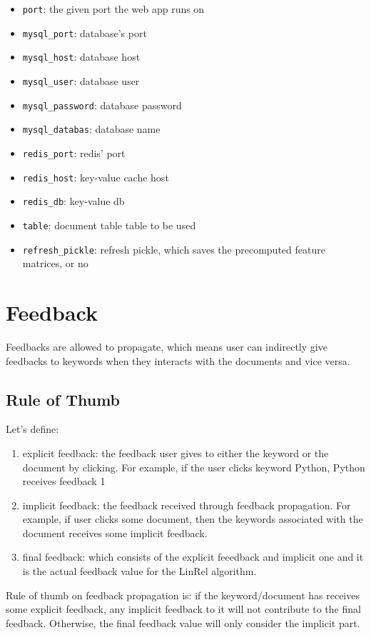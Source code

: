 \documentclass[10pt,a4paper]{article}
\begin{document}
\begin{itemize}
\item \verb+port+:  the given port  the web app runs on
\item \verb+mysql_port+:  database's port 
\item \verb+mysql_host+: database host
\item \verb+mysql_user+:  database user
\item \verb+mysql_password+:   database password
\item \verb+mysql_databas+:  database name
\item \verb+redis_port+:  redis' port 
\item \verb+redis_host+: key-value cache host
\item \verb+redis_db+: key-value db
\item \verb+table+:  document table table to be used 
\item \verb+refresh_pickle+: refresh pickle, which saves the precomputed feature matrices, or no
\end{itemize}

\section{Feedback}

Feedbacks are allowed to propagate, which means user can indirectly give feedbacks to keywords when they interacts with the documents and vice versa.

\subsection{Rule of Thumb}

Let's define:
\begin{enumerate}
  \item explicit feedback: the feedback user gives to either the keyword or the document by clicking. For example, if the user clicks keyword Python, Python receives feedback 1
  \item implicit feedback: the feedback received through feedback propagation. For example, if user clicks some document, then the keywords associated with the document receives some implicit feedback.
  \item final feedback: which consists of the explicit feeedback and implicit one and it is the actual feedback value for the LinRel algorithm.
\end{enumerate}

Rule of thumb on feedback propagation is:
if the keyword/document has receives some explicit feedback, any implicit feedback to it will not contribute to the final feedback. 
Otherwise, the final feedback value will only consider the implicit part.
\end{document}
